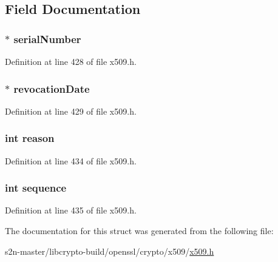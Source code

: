\subsection{Field Documentation}
\subsubsection[{\texorpdfstring{serial\+Number}{serialNumber}}]{ $\ast$ serial\+Number}\hypertarget{structx509__revoked__st_a957a5fd70cdff1e46a8df4d4bac22348}{}\label{structx509__revoked__st_a957a5fd70cdff1e46a8df4d4bac22348}


Definition at line 428 of file x509.\+h.

\subsubsection[{\texorpdfstring{revocation\+Date}{revocationDate}}]{ $\ast$ revocation\+Date}\hypertarget{structx509__revoked__st_a2bca038a3fcb213cd95fe8da7cf5c15d}{}\label{structx509__revoked__st_a2bca038a3fcb213cd95fe8da7cf5c15d}


Definition at line 429 of file x509.\+h.

\subsubsection[{\texorpdfstring{reason}{reason}}]{\setlength{\rightskip}{0pt plus 5cm}int reason}\hypertarget{structx509__revoked__st_abf19fa5e55c24b9556075afc7b302bbe}{}\label{structx509__revoked__st_abf19fa5e55c24b9556075afc7b302bbe}


Definition at line 434 of file x509.\+h.

\subsubsection[{\texorpdfstring{sequence}{sequence}}]{\setlength{\rightskip}{0pt plus 5cm}int sequence}\hypertarget{structx509__revoked__st_acc80722d9dd9349cbba06c72d6fb5972}{}\label{structx509__revoked__st_acc80722d9dd9349cbba06c72d6fb5972}


Definition at line 435 of file x509.\+h.



The documentation for this struct was generated from the following file\+:\begin{DoxyCompactItemize}
\item 
s2n-\/master/libcrypto-\/build/openssl/crypto/x509/\hyperlink{crypto_2x509_2x509_8h}{x509.\+h}\end{DoxyCompactItemize}
